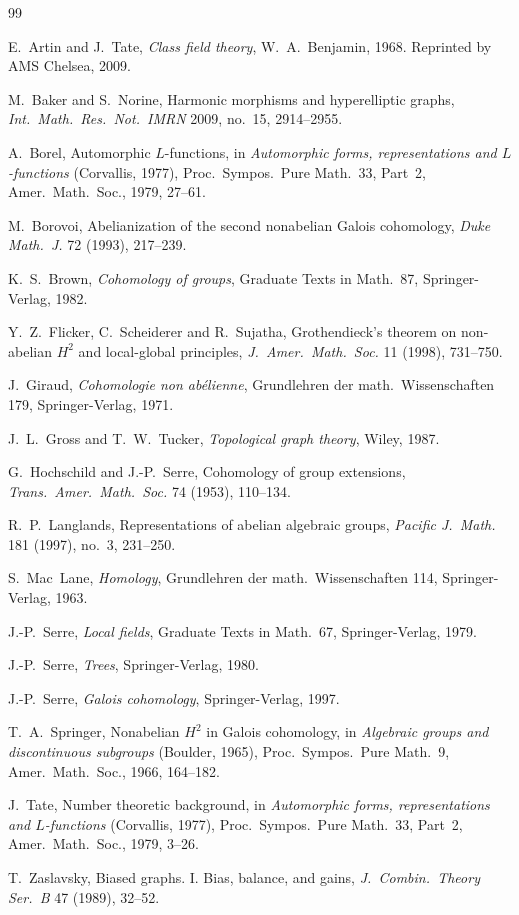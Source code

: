 \documentclass[12pt,letterpaper]{article}
\numberwithin{equation}{section}
\theoremstyle{plain}
\theoremstyle{definition}
\begin{document}
\begin{thebibliography}{99}

 E.~Artin and J.~Tate, \emph{Class field theory},
W.~A.~Benjamin, 1968. Reprinted by AMS Chelsea, 2009.

 M.~Baker and S.~Norine, Harmonic morphisms and
hyperelliptic graphs, \emph{Int.\ Math.\ Res.\ Not.\ IMRN} 2009, no.~15,
2914--2955.

 A.~Borel, Automorphic $L$-functions, in \emph{Automorphic
forms, representations and $L$-functions} (Corvallis, 1977), Proc.\ Sympos.\
Pure Math.\ 33, Part~2, Amer.\ Math.\ Soc., 1979, 27--61.

 M.~Borovoi, Abelianization of the second nonabelian
Galois cohomology, \emph{Duke Math.\ J.} 72 (1993), 217--239.

 K.~S.~Brown, \emph{Cohomology of groups}, Graduate Texts
in Math.\ 87, Springer-Verlag, 1982.

 Y.~Z.~Flicker, C.~Scheiderer and R.~Sujatha,
Grothendieck's theorem on non-abelian $H^2$ and local-global principles,
\emph{J.\ Amer.\ Math.\ Soc.} 11 (1998), 731--750.

 J.~Giraud, \emph{Cohomologie non ab\'elienne},
Grundlehren der math.\ Wissenschaften 179, Springer-Verlag, 1971.

 J.~L.~Gross and T.~W.~Tucker, \emph{Topological graph
theory}, Wiley, 1987.

 G.~Hochschild and J.-P.~Serre, Cohomology of group
extensions, \emph{Trans.\ Amer.\ Math.\ Soc.} 74 (1953), 110--134.

 R.~P.~Langlands, Representations of abelian algebraic
groups, \emph{Pacific J.\ Math.} 181 (1997), no.~3, 231--250.

 S.~Mac~Lane, \emph{Homology}, Grundlehren der math.\
Wissenschaften 114, Springer-Verlag, 1963.

 J.-P.~Serre, \emph{Local fields}, Graduate Texts in
Math.\ 67, Springer-Verlag, 1979.

 J.-P.~Serre, \emph{Trees}, Springer-Verlag, 1980.

\bibitem[Se97]{Se97} J.-P.~Serre, \emph{Galois cohomology}, Springer-Verlag,
1997.

 T.~A.~Springer, Nonabelian $H^2$ in Galois cohomology,
in \emph{Algebraic groups and discontinuous subgroups} (Boulder, 1965),
Proc.\ Sympos.\ Pure Math.\ 9, Amer.\ Math.\ Soc., 1966, 164--182.

\bibitem[Ta79]{Ta79} J.~Tate, Number theoretic background, in
\emph{Automorphic forms, representations and $L$-functions} (Corvallis,
1977), Proc.\ Sympos.\ Pure Math.\ 33, Part~2, Amer.\ Math.\ Soc., 1979,
3--26.

 T.~Zaslavsky, Biased graphs. I. Bias, balance, and gains,
\emph{J.\ Combin.\ Theory Ser.~B} 47 (1989), 32--52.

\end{thebibliography}
\end{document}
